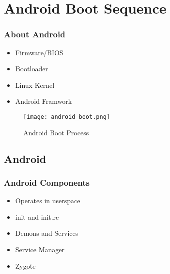 

\section{Android Boot Sequence}
\label{android_boot}



\begin{frame}
	\frametitle{About Android}
	\begin{itemize}
		\item Firmware/BIOS \pause
		\item Bootloader \pause
		\item Linux Kernel \pause
		\item Android Framwork \pause
	\end{itemize}

\end{frame}



\begin{frame}
\begin{figure}[h]
  \centering
    \texttt{[image: android\_boot.png]}
    \caption{Android Boot Process}
    \label{fig:android_boot}
\end{figure}
\end{frame}




\subsection{Android}

\begin{frame}
	\frametitle{Android Components}
	\begin{itemize}
		\item Operates in userspace \pause
		\item init and init.rc \pause
		\item Demons and Services \pause
		\item Service Manager \pause
		\item Zygote \pause
	\end{itemize}

\end{frame}
